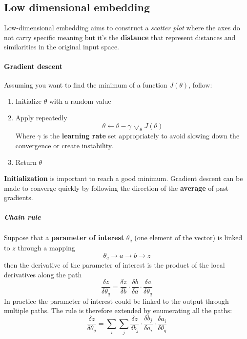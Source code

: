 \subsection{Low dimensional embedding}
Low-dimensional embedding aims to construct a \textit{scatter plot} where the axes do not carry specific meaning but it's the \textbf{distance} that represent distances and similarities in the original input space.

\paragraph{Gradient descent}
Assuming you want to find the minimum of a function $J(\theta)$, follow:
\begin{enumerate}
	\item Initialize $\theta$ with a random value
	\item Apply repeatedly 
	\begin{equation}
		\theta \longleftarrow \theta - \gamma \bigtriangledown_\theta J(\theta)
	\end{equation}
	Where $\gamma$ is the \textbf{learning rate} set  appropriately to avoid slowing down the convergence or create instability.
	\item Return $\theta$
\end{enumerate}
\begin{note}
	\textbf{Initialization} is important to reach a good minimum. Gradient descent can be made to converge quickly by following the direction of the \textbf{average} of past gradients.
\end{note}

\subparagraph{Chain rule} Suppose that a \textbf{parameter of interest} $\theta_q$ (one element of the vector) is linked to $z$ through a mapping
\begin{equation*}
	\theta_q \longrightarrow a \longrightarrow b \longrightarrow z
\end{equation*}
then the derivative of the parameter of interest is the product of the local derivatives along the path
\begin{equation*}
	\frac{\delta z}{\delta \theta_q} = \frac{\delta z}{\delta b} \cdot \frac{\delta b}{\delta a} \cdot \frac{\delta a}{\delta \theta_q}
\end{equation*}
In practice the parameter of interest could be linked to the output through multiple paths. The rule is therefore extended by enumerating all the paths:
\begin{equation*}
	\frac{\delta z}{\delta \theta_q} = \sum_i \sum_j \frac{\delta z}{\delta b_j} \cdot \frac{\delta b_j}{\delta a_i} \cdot \frac{\delta a_i}{\delta \theta_q}
\end{equation*}

